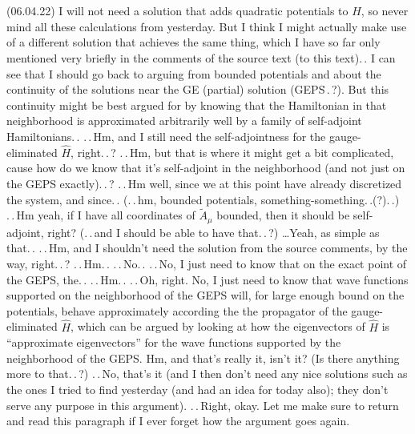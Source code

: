 \documentclass{report}
\begin{document}
(06.04.22) I will not need a solution that adds quadratic potentials to $\hat H$, so never mind all these calculations from yesterday. But I think I might actually make use of a different solution that achieves the same thing, which I have so far only mentioned very briefly in the %
comments of the source text (to this text).\,. I can see that I should go back to arguing from bounded potentials and about the continuity of the solutions near the GE (partial) solution (GEPS\.\,.\,?). But this continuity might be best argued for by knowing that the Hamiltonian in that neighborhood is approximated arbitrarily well by a family of self-adjoint Hamiltonians.\,. .\,.\,Hm, and I still need the self-adjointness for the gauge-eliminated $\hat H$, right.\,.\,? .\,.\,Hm, but that is where it might get a bit complicated, cause how do we know that it's self-adjoint in the neighborhood (and not just on the GEPS exactly).\,.\,? .\,.\,Hm well, since we at this point have already discretized the system, and since.\,. (.\,.\,hm, bounded potentials, something-something.\,.(?).\,.) .\,.\,Hm yeah, if I have all coordinates of $\tilde A_\mu$ bounded, then it should be self-adjoint, right? (.\,.\,and I should be able to have that.\,.\,?) 
\ldots Yeah, as simple as that.\,. .\,.\,Hm, and I shouldn't need the solution from the source comments, by the way, right.\,.\,? .\,.\,Hm.\,. .\,.\,No.\,. .\,.\,No, I just need to know that on the exact point of the GEPS, the.\,. .\,.\,Hm.\,. .\,.\,Oh, right. No, I just need to know that wave functions supported on the neighborhood of the GEPS will, for large enough bound on the potentials, behave approximately according the the propagator of the gauge-eliminated $\hat H$, which can be argued by looking at how the eigenvectors of $\hat H$ is ``approximate eigenvectors'' for the wave functions supported by the neighborhood of the GEPS. Hm, and that's really it, isn't it? (Is there anything more to that.\,.\,?) .\,.\,No, that's it (and I then don't need any nice solutions such as the ones I tried to find yesterday (and had an idea for today also); they don't serve any purpose in this argument). .\,.\,Right, okay. Let me make sure to return and read this paragraph if I ever forget how the argument goes again. 
\end{document}
